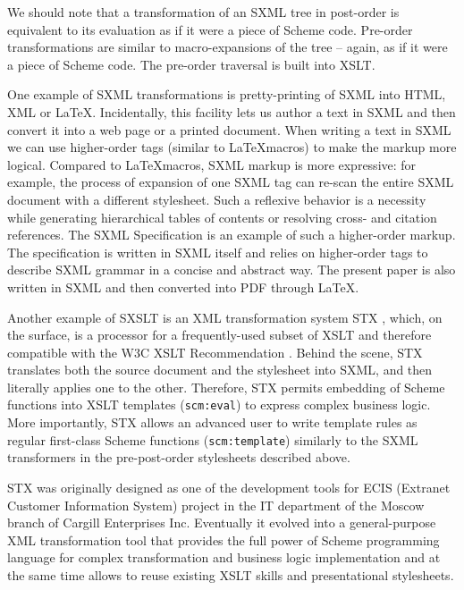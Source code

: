 \documentclass[10pt]{llncs}
\begin{document}
We should note that a transformation of an SXML tree in post-order is
equivalent to its evaluation as if it were a piece of Scheme
code. Pre-order transformations are similar to macro-expansions of the
tree -- again, as if it were a piece of Scheme code. The pre-order
traversal is built into XSLT.

One example of SXML transformations is pretty-printing of SXML
into HTML, XML or \LaTeX . Incidentally, this facility lets us
author a text in SXML and then convert it into a web page or a printed
document. When writing a text in SXML we can use higher-order tags (similar
to \LaTeX  macros) to make the markup more
logical. Compared to \LaTeX  macros, SXML markup is more
expressive: for example, the process of expansion of one SXML tag can
re-scan the entire SXML document with a different stylesheet. Such a
reflexive behavior is a necessity while generating hierarchical tables
of contents or resolving cross- and citation references.  The SXML
Specification is an example of such a higher-order markup. The
specification is written in SXML itself and relies on higher-order
tags to describe SXML grammar in a concise and abstract way. The
present paper is also written in SXML and then converted into PDF
through \LaTeX .

Another example of SXSLT is an XML transformation system STX
\cite{STX}, which, on the surface, is a processor for a
frequently-used subset of XSLT and therefore compatible with the W3C
XSLT Recommendation \cite{XSLT}. Behind the scene, STX
translates both the source document and the stylesheet into SXML, and
then literally applies one to the other. Therefore, STX permits
embedding of Scheme functions into XSLT templates (\texttt{scm:eval}) to express complex business logic. More importantly, STX
allows an advanced user to write template rules as regular first-class
Scheme functions (\texttt{scm:template}) similarly to the SXML
transformers in the pre-post-order stylesheets described above.

STX was originally designed as one of the development tools for
ECIS (Extranet Customer Information System) project in the IT department of
the Moscow branch of Cargill Enterprises Inc. Eventually it evolved
into a general-purpose XML transformation tool that provides the full
power of Scheme programming language for complex transformation and
business logic implementation and at the same time allows to reuse
existing XSLT skills and presentational stylesheets.
\end{document}
